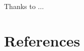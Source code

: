 \documentclass[authoryear,preprint,review,12pt]{elsarticle}
\begin{document}
Thanks to ...




\section{References}
\label{sec_reference}

 
%



%
%
\end{document}
